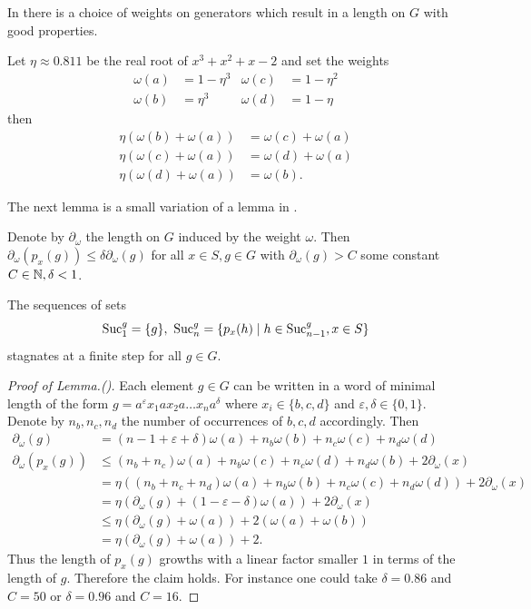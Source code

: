 \documentclass[a4paper,11pt]{amsart}
\begin{document}
In \cite{Bartholdi:Growth} there is a choice of weights on generators which result in a length on $G$ with good properties.
\begin{lem} \label{lem:laurentsweights}
 Let $\eta\approx 0.811$ be the real root of $x^3+x^2+x-2$ and set the weights 
 \begin{align*}
  \omega(a) &= 1-\eta^3 & \omega(c)&=1-\eta^2 \\ \omega(b)&= \eta^3 & \omega(d)&=1-\eta
 \end{align*}
 then 
 \begin{align*}
  \eta(\omega(b)+\omega(a)) &= \omega(c)+\omega(a) \\
  \eta(\omega(c)+\omega(a)) &= \omega(d)+\omega(a) \\
  \eta(\omega(d)+\omega(a)) &= \omega(b).
 \end{align*}
\end{lem}
The next lemma is a small variation of a lemma in \cite{Bartholdi:Growth}.
\begin{lem}
 Denote by $\partial_\omega$ the length on $G$ induced by the weight $\omega$. Then
 $\partial_\omega(p_x(g)) \leq \delta \partial_\omega(g)$ for all $x\in S, g\in G$ with $\partial_\omega(g)>C$ some constant $C\in\mathbb{N},\delta<1$.
\end{lem}
\begin{cor}
The sequences of sets
 \[\textup{Suc}_1^g=\{g\},\ \textup{Suc}_n^g = \{p_x(h) \mid h\in \textup{Suc}_{n-1}^g, x\in S\} \]
 stagnates at a finite step for all $g\in G$.
\end{cor}
\begin{proof}[Proof of Lemma.(\cite{Bartholdi:Growth})] 
 Each element $g\in G$ can be written in a word of minimal length of the form $g=a^\varepsilon x_1 a x_2 a\ldots x_n a^\delta$ where
 $x_i\in \{b,c,d\}$ and $\varepsilon,\delta\in \{0,1\}$. Denote by $n_b,n_c,n_d$ the number of occurrences of $b,c,d$ accordingly. 
 Then
 \begin{align*}
  \partial_\omega(g) &= (n-1+\varepsilon+\delta)\omega(a)+n_b\omega(b)+n_c\omega(c)+n_d\omega(d)\\
  \partial_\omega(p_x(g)) &\leq (n_b+n_c)\omega(a)+n_b\omega(c)+n_c\omega(d)+n_d\omega(b) + 2\partial_\omega(x)\\
  &= \eta\left( (n_b+n_c+n_d)\omega(a)+n_b\omega(b)+n_c\omega(c)+n_d\omega(d) \right) + 2\partial_\omega(x)\\
  &= \eta(\partial_\omega(g) +(1-\varepsilon-\delta)\omega(a)) + 2\partial_\omega(x) \\
  &\leq \eta(\partial_\omega(g)+\omega(a)) + 2(\omega(a)+\omega(b))\\
  &= \eta(\partial_\omega(g)+\omega(a)) + 2.
 \end{align*}
 Thus the length of $p_x(g)$ growths with a linear factor smaller $1$ in terms of the length of $g$. Therefore the claim holds.
 For instance one could take $\delta =0.86$ and $C=50$ or $\delta=0.96$ and $C=16$.
\end{proof}
\end{document}
